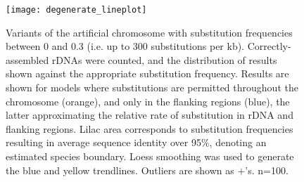 \begin{figure}[!b]
  \centering
    \texttt{[image: degenerate\_lineplot]}
  \caption{Variants of the artificial chromosome with substitution frequencies between 0 and 0.3 (i.e. up to 300 substitutions per kb). Correctly-assembled rDNAs were counted, and the distribution of results shown against the appropriate substitution frequency. Results are shown for models where substitutions are permitted throughout the chromosome (orange), and only in the flanking regions (blue), the latter approximating the relative rate of substitution in rDNA and flanking regions. Lilac area corresponds to substitution frequencies resulting in average sequence identity over 95\%, denoting an estimated species boundary. Loess smoothing was used to generate the blue and yellow trendlines. Outliers are shown as $+$'s. n=100.}
  \label{fig:degen}
\end{figure}
